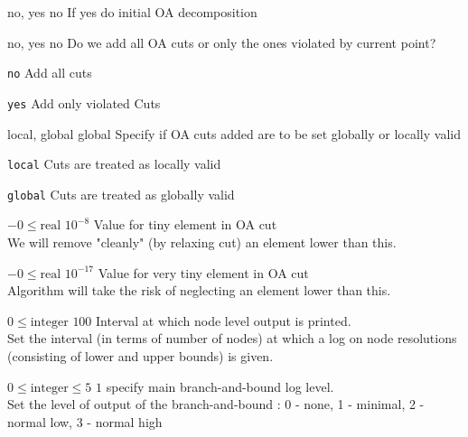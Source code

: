 %
{\ttfamily no, yes}%
{no}%
{If yes do initial OA decomposition}%
{}

%
{\ttfamily no, yes}%
{no}%
{Do we add all OA cuts or only the ones violated by current point?}%
{\begin{list}{}{
\setlength{\parsep}{0em}
\setlength{\leftmargin}{5ex}
\setlength{\labelwidth}{2ex}
\setlength{\itemindent}{0ex}
\setlength{\topsep}{0pt}}
\item[\texttt{no}] Add all cuts
\item[\texttt{yes}] Add only violated Cuts
\end{list}
}

%
{\ttfamily local, global}%
{global}%
{Specify if OA cuts added are to be set globally or locally valid}%
{\begin{list}{}{
\setlength{\parsep}{0em}
\setlength{\leftmargin}{5ex}
\setlength{\labelwidth}{2ex}
\setlength{\itemindent}{0ex}
\setlength{\topsep}{0pt}}
\item[\texttt{local}] Cuts are treated as locally valid
\item[\texttt{global}] Cuts are treated as globally valid
\end{list}
}

%
{$-0\leq\textrm{real}$}%
{$10^{- 8}$}%
{Value for tiny element in OA cut\\
We will remove "cleanly" (by relaxing cut) an element lower than this.}%
{}

%
{$-0\leq\textrm{real}$}%
{$10^{-17}$}%
{Value for very tiny element in OA cut\\
Algorithm will take the risk of neglecting an element lower than this.}%
{}

%
{$0\leq\textrm{integer}$}%
{$100$}%
{Interval at which node level output is printed.\\
Set the interval (in terms of number of nodes) at which a log on node resolutions (consisting of lower and upper bounds) is given.}%
{}

%
{$0\leq\textrm{integer}\leq5$}%
{$1$}%
{specify main branch-and-bound log level.\\
Set the level of output of the branch-and-bound : 0 - none, 1 - minimal, 2 - normal low, 3 - normal high}%
{}

